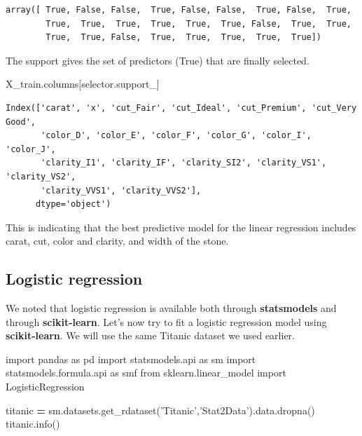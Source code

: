 \documentclass[
  letterpaper,
]{scrbook}
\newenvironment{Shaded}{\begin{snugshade}}{\end{snugshade}}
\newcommand{\ImportTok}[1]{#1}
\newcommand{\NormalTok}[1]{#1}
\newcommand{\OperatorTok}[1]{\textcolor[rgb]{0.81,0.36,0.00}{\textbf{#1}}}
\newcommand{\StringTok}[1]{\textcolor[rgb]{0.31,0.60,0.02}{#1}}
\begin{document}
\begin{verbatim}
array([ True, False, False,  True, False, False,  True, False,  True,
        True,  True,  True,  True,  True,  True, False,  True,  True,
        True,  True, False,  True,  True,  True,  True,  True])
\end{verbatim}

The support gives the set of predictors (True) that are finally selected.

\begin{Shaded}
\begin{Highlighting}[]
\NormalTok{X_train.columns[selector.support_]}
\end{Highlighting}
\end{Shaded}

\begin{verbatim}
Index(['carat', 'x', 'cut_Fair', 'cut_Ideal', 'cut_Premium', 'cut_Very Good',
       'color_D', 'color_E', 'color_F', 'color_G', 'color_I', 'color_J',
       'clarity_I1', 'clarity_IF', 'clarity_SI2', 'clarity_VS1', 'clarity_VS2',
       'clarity_VVS1', 'clarity_VVS2'],
      dtype='object')
\end{verbatim}

This is indicating that the best predictive model for the linear regression includes carat, cut, color and clarity, and width of the stone.

\hypertarget{logistic-regression}{%
\subsection{Logistic regression}\label{logistic-regression}}

We noted that logistic regression is available both through \textbf{statsmodels} and through \textbf{scikit-learn}. Let's now try to fit a
logistic regression model using \textbf{scikit-learn}. We will use the same
Titanic dataset we used earlier.

\begin{Shaded}
\begin{Highlighting}[]
\ImportTok{import}\NormalTok{ pandas }\ImportTok{as}\NormalTok{ pd}
\ImportTok{import}\NormalTok{ statsmodels.api }\ImportTok{as}\NormalTok{ sm}
\ImportTok{import}\NormalTok{ statsmodels.formula.api }\ImportTok{as}\NormalTok{ smf}
\ImportTok{from}\NormalTok{ sklearn.linear_model }\ImportTok{import}\NormalTok{ LogisticRegression}

\NormalTok{titanic }\OperatorTok{=}\NormalTok{ sm.datasets.get_rdataset(}\StringTok{'Titanic'}\NormalTok{,}\StringTok{'Stat2Data'}\NormalTok{).data.dropna()}
\NormalTok{titanic.info()}
\end{Highlighting}
\end{Shaded}
\end{document}
